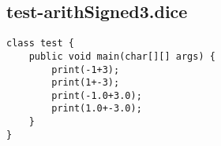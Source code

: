 \subsection{test-arithSigned3.dice}
\begin{verbatim}
class test {
	public void main(char[][] args) {
		print(-1+3);
		print(1+-3);
		print(-1.0+3.0);
		print(1.0+-3.0);
	}
}
\end{verbatim}